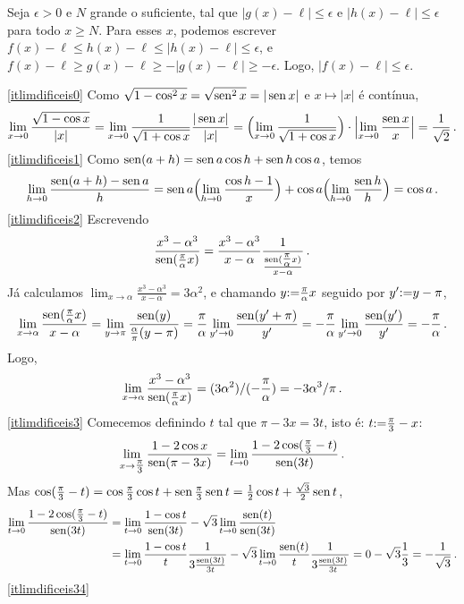 \begin{Solution}{4.34}
Seja $\epsilon>0$ e $N$ grande o suficiente, tal que $|g(x)-\ell|\leq \epsilon$ e $|h(x)-\ell|\leq \epsilon$ para todo $x\geq N$.
Para esses $x$, podemos escrever $f(x)-\ell \leq h(x)-\ell\leq |h(x)-\ell|\leq \epsilon$, e $f(x)-\ell\geq g(x)-\ell\geq -|g(x)-\ell|\geq -\epsilon$. Logo, $|f(x)-\ell|\leq \epsilon$.
\end{Solution}
\begin{Solution}{4.35}
\eqref{itlimdificeis0} Como $\sqrt{1-\cos^2x}=\sqrt{\operatorname{sen}^2x}=|\operatorname{sen} x|$ e
$x\mapsto |x|$ é contínua,
$$\lim_{x\to 0}\frac{\sqrt{1-\cos x}}{|x|}=\lim_{x\to
0}\frac{1}{\sqrt{1+\cos x}}\frac{|\operatorname{sen} x|}{|x|}
=\Bigl(\lim_{x\to 0}\frac{1}{\sqrt{1+\cos x}}\Bigr)
\cdot \Bigl|
\lim_{x\to 0}\frac{\operatorname{sen} x}{x}\Bigr|=\frac{1}{\sqrt{2}}\,.
$$
\eqref{itlimdificeis1} Como $\operatorname{sen} (a+h)=\operatorname{sen} a\cos h+\operatorname{sen} h\cos a$, temos
$$
\lim_{h\to 0}\frac{\operatorname{sen} (a+h)-\operatorname{sen} a}{h}=\operatorname{sen} a \Bigl(\lim_{h\to 0}\frac{\cos
h-1}{x}\Bigr)+\cos a\Bigl(\lim_{h\to 0}\frac{\operatorname{sen} h}{h}\Bigr)=\cos a\,.
$$
\eqref{itlimdificeis2} Escrevendo
$$
\frac{x^3-\alpha^3}{\operatorname{sen} (\tfrac{\pi}{\alpha}x)}=
\frac{x^3-\alpha^3}{x-\alpha}\frac{1}{\frac{\operatorname{sen}
(\tfrac{\pi}{\alpha}x)}{x-\alpha}}\,.
$$
Já calculamos $\lim_{x\to \alpha}\frac{x^3-\alpha^3}{x-\alpha}= 3\alpha^2$, e
chamando $y{:=} \tfrac{\pi}{\alpha}x$ seguido por $y'{:=} y-\pi$,
$$\lim_{x\to \alpha}\frac{\operatorname{sen}(\tfrac{\pi}{\alpha}x)}{x-\alpha}
=\lim_{y\to \pi}\frac{\operatorname{sen}(y)}{\frac{\alpha}{\pi}(y-\pi)}
=\frac{\pi}{\alpha}\lim_{y'\to 0}\frac{\operatorname{sen}(y'+\pi)}{y'}
=-\frac{\pi}{\alpha}\lim_{y'\to 0}\frac{\operatorname{sen}(y')}{y'}=-\frac{\pi}{\alpha}\,.$$
Logo,
$$
\lim_{x\to \alpha}\frac{x^3-\alpha^3}{\operatorname{sen}
(\tfrac{\pi}{\alpha}x)}=(3\alpha^2)/ (-\frac{\pi}{\alpha})=-3\alpha^3/ \pi\,.
$$
\eqref{itlimdificeis3} Comecemos definindo $t$ tal que $\pi-3x=3t$, isto é:
$t{:=} \tfrac{\pi}{3}-x$:
$$\lim_{x\to \tfrac{\pi}{3}}\frac{1-2\cos
x}{\operatorname{sen}(\pi-3x)}=\lim_{t\to 0}\frac{1-2\cos (\tfrac{\pi}{3}-t)}{\operatorname{sen} (3t)}\,.$$
Mas $\cos (\tfrac{\pi}{3}-t)=\cos \tfrac{\pi}{3}\cos t+\operatorname{sen} \tfrac{\pi}{3}\operatorname{sen}
t=\frac12\cos t+\frac{\sqrt{3}}{2}\operatorname{sen} t$,
\begin{align*}
\lim_{t\to 0}\frac{1-2\cos (\tfrac{\pi}{3}-t)}{\operatorname{sen} (3t)}&=
\lim_{t\to 0}\frac{1-\cos t}{\operatorname{sen} (3t)}-\sqrt{3}\lim_{t\to 0}\frac{\operatorname{sen}
(t)}{\operatorname{sen} (3t)}\\
&=\lim_{t\to 0}\frac{1-\cos t}{t}\frac{1}{
3\frac{\operatorname{sen} (3t)}{3t}}-
\sqrt{3}\lim_{t\to
0}\frac{\operatorname{sen} (t)}{t}\frac{1}{3\frac{\operatorname{sen}
(3t)}{3t}}=0-\sqrt{3}\frac{1}{3}=-\frac{1}{\sqrt{3}}\,.
\end{align*}
\eqref{itlimdificeis34}

\end{Solution}
